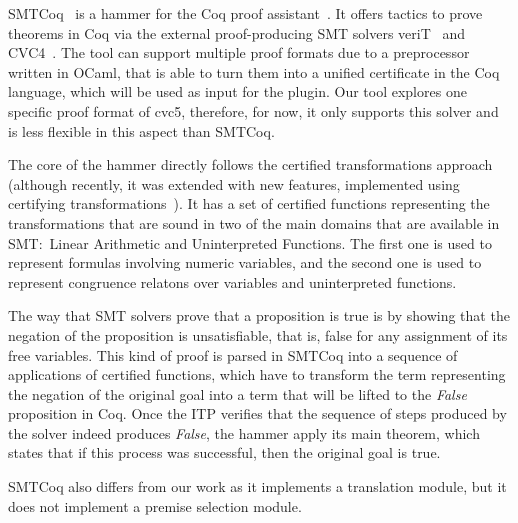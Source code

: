 SMTCoq~\cite{smtcoq} is a hammer for the Coq proof assistant~\cite{Bertot2004}.
It offers tactics to prove theorems in Coq via the external proof-producing SMT
solvers veriT~\cite{Bouton2009} and CVC4~\cite{Barrett2011}. The tool can support multiple proof formats
due to a preprocessor written in OCaml, that is able to turn them
into a unified certificate in the Coq language,
which will be used as input for the plugin. Our tool explores one specific
proof format of cvc5, therefore, for now, it only supports this solver and is
less flexible in this aspect than SMTCoq.

The core of the hammer directly follows the certified transformations approach (although recently, it was
extended with new features, implemented using certifying transformations~\cite{snipe}).
It has a set of certified functions representing the transformations
that are sound in two of the main domains that are available in SMT:\
Linear Arithmetic and Uninterpreted Functions. The first one is used to
represent formulas involving numeric variables, and the second one is
used to represent congruence relatons over variables and uninterpreted functions.

The way that SMT solvers prove
that a proposition is true is by showing that the negation of the proposition is unsatisfiable,
that is, false for any assignment of its free variables. This kind of proof
is parsed in SMTCoq into a sequence of applications of certified functions, which have
to transform the term representing the negation of the original goal into a
term that will be lifted to the \textit{False} proposition in Coq. Once the
ITP verifies that the sequence of steps produced by the solver indeed
produces \textit{False}, the hammer apply its main theorem, which states that if
this process was successful, then the original goal is true.

SMTCoq also differs from our work as it implements a translation module, but
it does not implement a premise selection module.
